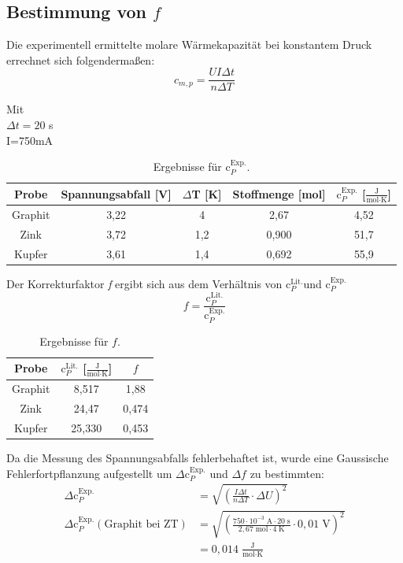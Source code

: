 \documentclass[12pt,a4paper,titlepage,headinclude,bibtotoc]{scrartcl}
\begin{document}
\subsection{Bestimmung von $f$}

Die experimentell ermittelte molare Wärmekapazität bei konstantem Druck errechnet sich folgendermaßen:\\

\begin{equation}
c_{m,p} = \frac{UI\Delta t}{n\Delta T}
\end{equation}

Mit\\
$\Delta t= 20$ s\\
I=750mA\\

\begin{table}[h!]
\centering
\caption{Ergebnisse für $\text{c}_P^{\text{Exp.}}$.}
\begin{tabular}{c|c|c|c|c}
Probe& Spannungsabfall [V] & $\Delta$T [K]& Stoffmenge [mol] &  $\text{c}_P^{\text{Exp.}}$ [$\frac{\text{J}}{\text{mol}\cdot\text{K}}$]\\
\hline
Graphit & 3,22&4 &2,67 &4,52 \\
\hline
Zink & 3,72 & 1,2&0,900&51,7  \\
\hline
Kupfer & 3,61& 1,4& 0,692 &55,9\\
\end{tabular}
\end{table}
Der Korrekturfaktor \textit{f} ergibt sich aus dem Verhältnis von $\text{c}_P^{\text{Lit.}}$und $\text{c}_P^{\text{Exp.}}$
\begin{equation}
f=\frac{\text{c}_P^{\text{Lit.}}}{\text{c}_P^{\text{Exp.}}}
\end{equation}
\begin{table}[h!]
\centering
\caption{Ergebnisse für $f$.}
\begin{tabular}{c|c|c}
Probe&$\text{c}_P^{\text{Lit.}}$ [$\frac{\text{J}}{\text{mol}\cdot\text{K}}$]&$f$\\
\hline
Graphit &8,517 &1,88 \\
\hline
Zink & 24,47&0,474  \\
\hline
Kupfer & 25,330&0,453\\
\end{tabular}
\end{table}
Da die Messung des Spannungsabfalls fehlerbehaftet ist, wurde eine Gaussische Fehlerfortpflanzung aufgestellt um $\Delta\text{c}_P^{\text{Exp.}}$ und $\Delta f$ zu bestimmten:
\begin{align}
\Delta \text{c}_P^{\text{Exp.}}&=\sqrt{ \left(\frac{I\Delta t}{n\Delta T}\cdot \Delta U \right)^2}\\
\Delta \text{c}_P^{\text{Exp.}}(\text{Graphit bei ZT})&=\sqrt{ \left(\frac{750\cdot 10^{-3}\;\text{A} \cdot 20\;\text{s}}{2,67\;\text{mol}\cdot 4\;\text{K}}\cdot 0,01\;\text{V} \right)^2}\\
&=0,014 \;\frac{\text{J}}{\text{mol}\cdot\text{K}}
\end{align}
\end{document}

